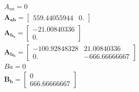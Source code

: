 \documentclass[
	12pt,				%
	article,			%
	openright,			%
	oneside,
	a4paper,			%
	chapter=TITLE,		%
	section=TITLE,		%
	english,			%
	french,				%
	spanish,			%
	brazil,				%
]{abntex2}
\begin{document}
                \begin{eqnarray}
                    \nonumber
                    A_{aa} = 0 \\
                    \nonumber
                    \boldsymbol{A_{ab}} = 
                    \begin{bmatrix}
                        559.44055944 &  0.
                    \end{bmatrix} \\
                    \nonumber
                    \boldsymbol{A_{b_a}} = 
                    \begin{bmatrix}
                        -21.00840336 \\
                        0.
                    \end{bmatrix} \\
                    \nonumber
                    \boldsymbol{A_{b_b}} =
                    \begin{bmatrix}
                        -100.92848328 & 21.00840336 \\
                        0.            & -666.66666667
                    \end{bmatrix} \\
                    \nonumber
                    Ba = 0 \\
                    \nonumber
                    \boldsymbol{B_b} = 
                    \begin{bmatrix}
                        0 \\
                        666.66666667
                    \end{bmatrix}
                \end{eqnarray}
                
\end{document}
